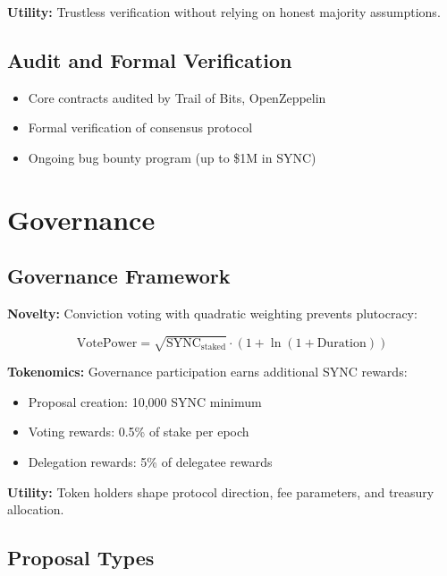 \documentclass[12pt,a4paper]{article}
\begin{document}
\textbf{Utility:} Trustless verification without relying on honest majority assumptions.

\subsection{Audit and Formal Verification}

\begin{itemize}
    \item Core contracts audited by Trail of Bits, OpenZeppelin
    \item Formal verification of consensus protocol
    \item Ongoing bug bounty program (up to \$1M in SYNC)
\end{itemize}

\section{Governance}

\subsection{Governance Framework}

\textbf{Novelty:} Conviction voting with quadratic weighting prevents plutocracy:

\begin{equation}
\text{VotePower} = \sqrt{\text{SYNC}_{\text{staked}}} \cdot (1 + \ln(1 + \text{Duration}))
\end{equation}

\textbf{Tokenomics:} Governance participation earns additional SYNC rewards:
\begin{itemize}
    \item Proposal creation: 10,000 SYNC minimum
    \item Voting rewards: 0.5\% of stake per epoch
    \item Delegation rewards: 5\% of delegatee rewards
\end{itemize}

\textbf{Utility:} Token holders shape protocol direction, fee parameters, and treasury allocation.

\subsection{Proposal Types}
\end{document}
